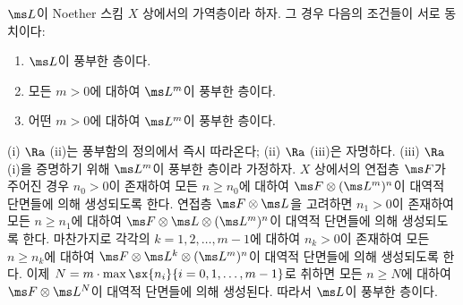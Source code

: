 	
	\begin{proposition}
	$\ms L$이 Noether 스킴 $X$ 상에서의 가역층이라 하자. 그 경우 다음의 조건들이 서로 동치이다:
	\begin{enumerate}[label=(\roman*)]
	\item $\ms L$이 풍부한 층이다.
	\item 모든 $m>0$에 대하여 $\ms L^m$이 풍부한 층이다.
	\item 어떤 $m>0$에 대하여 $\ms L^m$이 풍부한 층이다.\\
	\end{enumerate}
	\pf (i) $\Ra$ (ii)는 풍부함의 정의에서 즉시 따라온다; (ii) $\Ra$ (iii)은 자명하다.
	(iii) $\Ra$ (i)을 증명하기 위해 $\ms L^m$이 풍부한 층이라 가정하자.
	$X$ 상에서의 연접층 $\ms F$가 주어진 경우 $n_0>0$이 존재하여
	모든 $n\ge n_0$에 대하여 $\ms F\otimes(\ms L^m)^n$이 대역적 단면들에 의해 생성되도록 한다.
	연접층 $\ms F\otimes\ms L$을 고려하면 $n_1>0$이 존재하여 모든 $n\ge n_1$에 대하여
	$\ms F\otimes\ms L\otimes(\ms L^m)^n$이 대역적 단면들에 의해 생성되도록 한다.
	마찬가지로 각각의 $k=1,2,\ldots,m-1$에 대하여 $n_k>0$이 존재하여 모든 $n\ge n_k$에 대하여
	$\ms F\otimes\ms L^k\otimes(\ms L^m)^n$이 대역적 단면들에 의해 생성되도록 한다.
	이제 $N=m\cdot\max\sx{n_i}{i=0,1,\ldots,m-1}$로 취하면 모든 $n\ge N$에 대하여
	$\ms F\otimes\ms L^N$이 대역적 단면들에 의해 생성된다. 따라서 $\ms L$이 풍부한 층이다.
	\end{proposition}
	

